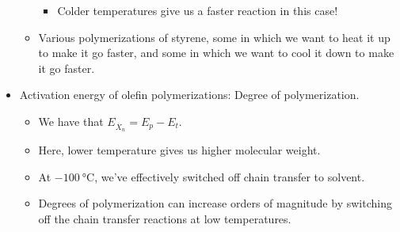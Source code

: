\documentclass[../notes.tex]{subfiles}
\begin{document}
\begin{itemize}
\begin{itemize}
\begin{itemize}
            \item Colder temperatures give us a faster reaction in this case!
        \end{itemize}
        \item Various polymerizations of styrene, some in which we want to heat it up to make it go faster, and some in which we want to cool it down to make it go faster.
    \end{itemize}
    \item Activation energy of olefin polymerizations: Degree of polymerization.
    \begin{itemize}
        \item We have that $E_{\overline{X}_n}=E_p-E_t$.
        \item Here, lower temperature gives us higher molecular weight.
        \item At $-\SI{100}{\celsius}$, we've effectively switched off chain transfer to solvent.
        \item Degrees of polymerization can increase orders of magnitude by switching off the chain transfer reactions at low temperatures.
    \end{itemize}
\end{itemize}
\end{document}
